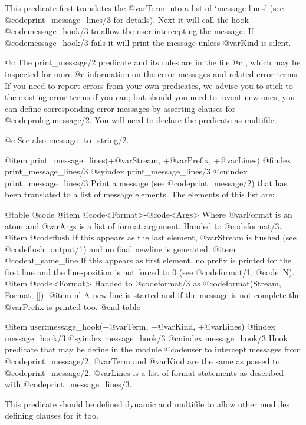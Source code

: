 {{{{This predicate first translates the @var{Term} into a list of `message
lines' (see @code{print_message_lines/3} for details).  Next it will
call the hook @code{message_hook/3} to allow the user intercepting the
message.  If @code{message_hook/3} fails it will print the message unless
@var{Kind} is silent.

@c The print_message/2 predicate and its rules are in the file
@c , which may be inspected for more
@c information on the error messages and related error terms. 
If you need to report errors from your own predicates, we advise you to
stick to the existing error terms if you can; but should you need to
invent new ones, you can define corresponding error messages by
asserting clauses for @code{prolog:message/2}. You will need to declare
the predicate as multifile.

@c See also message_to_string/2.

@item print_message_lines(+@var{Stream}, +@var{Prefix}, +@var{Lines})
@findex print_message_lines/3
@syindex print_message_lines/3
@cnindex print_message_lines/3
Print a message (see @code{print_message/2}) that has been translated to
a list of message elements.  The elements of this list are:

@table @code
    @item @code{<Format>}-@code{<Args>}
        Where @var{Format} is an atom and @var{Args} is a list
	of format argument.  Handed to @code{format/3}.
    @item @code{flush}
	If this appears as the last element, @var{Stream} is flushed
	(see @code{flush_output/1}) and no final newline is generated.
    @item @code{at_same_line}
        If this appears as first element, no prefix is printed for
	the first line and the line-position is not forced to 0
	(see @code{format/1}, @code{~N}).
    @item @code{<Format>}
        Handed to @code{format/3} as @code{format(Stream, Format, [])}.
    @item nl
        A new line is started and if the message is not complete
	the @var{Prefix} is printed too.
@end table

@item user:message_hook(+@var{Term}, +@var{Kind}, +@var{Lines})
@findex message_hook/3
@syindex message_hook/3
@cnindex message_hook/3
Hook predicate that may be define in the module @code{user} to intercept
messages from @code{print_message/2}. @var{Term} and @var{Kind} are the
same as passed to @code{print_message/2}. @var{Lines} is a list of
format statements as described with @code{print_message_lines/3}.

This predicate should be defined dynamic and multifile to allow other
modules defining clauses for it too.

}}}}
